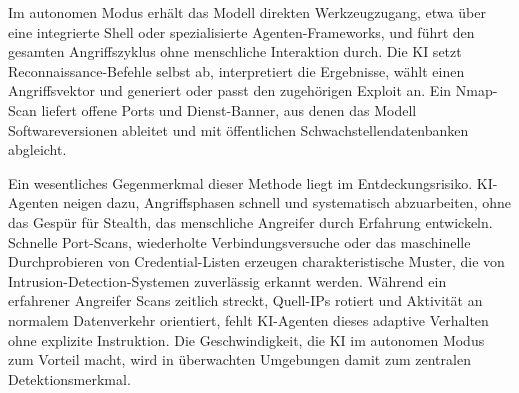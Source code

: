 Im autonomen Modus erhält das Modell direkten Werkzeugzugang, etwa über eine integrierte Shell oder spezialisierte Agenten-Frameworks, und führt den gesamten Angriffszyklus ohne menschliche Interaktion durch. Die KI setzt Reconnaissance-Befehle selbst ab, interpretiert die Ergebnisse, wählt einen Angriffsvektor und generiert oder passt den zugehörigen Exploit an. Ein Nmap-Scan liefert offene Ports und Dienst-Banner, aus denen das Modell Softwareversionen ableitet und mit öffentlichen Schwachstellendatenbanken abgleicht.

Ein wesentliches Gegenmerkmal dieser Methode liegt im Entdeckungsrisiko. KI-Agenten neigen dazu, Angriffsphasen schnell und systematisch abzuarbeiten, ohne das Gespür für Stealth, das menschliche Angreifer durch Erfahrung entwickeln. Schnelle Port-Scans, wiederholte Verbindungsversuche oder das maschinelle Durchprobieren von Credential-Listen erzeugen charakteristische Muster, die von Intrusion-Detection-Systemen zuverlässig erkannt werden. Während ein erfahrener Angreifer Scans zeitlich streckt, Quell-IPs rotiert und Aktivität an normalem Datenverkehr orientiert, fehlt KI-Agenten dieses adaptive Verhalten ohne explizite Instruktion. Die Geschwindigkeit, die KI im autonomen Modus zum Vorteil macht, wird in überwachten Umgebungen damit zum zentralen Detektionsmerkmal.
